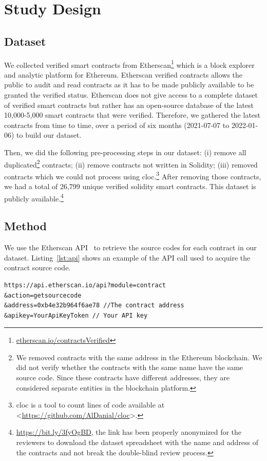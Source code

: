 \documentclass[10pt,conference]{IEEEtran}
\newcommand{\totalContracts}{26,799\xspace}
\begin{document}
\section{Study Design}
\subsection{Dataset}

We collected verified smart contracts from Etherscan\footnote{\url{etherscan.io/contractsVerified}} which is a block explorer and analytic platform for Ethereum. Etherscan verified contracts allows the public to audit and read contracts as it has to be made publicly available to be granted the verified status. Etherscan does not give access to a complete dataset of verified smart contracts but rather has an open-source database of the latest 10,000-5,000 smart contracts that were verified. Therefore, we gathered the latest contracts from time to time, over a period of six months (2021-07-07 to 2022-01-06) to build our dataset.

Then, we did the following pre-processing steps in our dataset: (i) remove all duplicated\footnote{We removed contracts with the same address in the Ethereum blockchain. We did not verify whether the contracts with the same name have the same source code. Since these contracts have different addresses, they are considered separate entities in the blockchain platform.} contracts; (ii) remove contracts not written in Solidity; (iii) removed contracts which we could not process using cloc.\footnote{cloc is a tool to count lines of code available at <\url{https://github.com/AlDanial/cloc}>.} After removing those contracts, we had a total of \totalContracts unique verified solidity smart contracts. This dataset is publicly available.\footnote{\url{https://bit.ly/3fyOgBD}, the link has been properly anonymized for the reviewers to download the dataset spreadsheet with the name and address of the contracts and not break the double-blind review process.}


\subsection{Method}

We use the Etherscan API~\cite{etherscan_api} to retrieve the source codes for each contract in our dataset. Listing~\ref{lst:api} shows an example of the API call used to acquire the contract source code.
\begin{lstlisting}[language=solidity, caption=Etherscan API call, label={lst:api}]
https://api.etherscan.io/api?module=contract
&action=getsourcecode
&address=0xb4e32b964f6ae78 //The contract address
&apikey=YourApiKeyToken // Your API key
\end{lstlisting}
\end{document}
